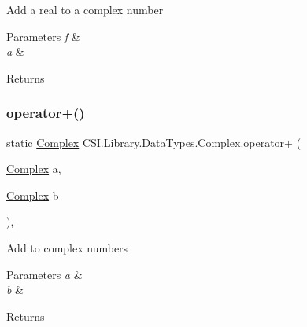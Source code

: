 Add a real to a complex number 


\begin{DoxyParams}{Parameters}
{\em f} & \\
\hline
{\em a} & \\
\hline
\end{DoxyParams}
\begin{DoxyReturn}{Returns}

\end{DoxyReturn}
\mbox{\label{struct_c_s_i_1_1_library_1_1_data_types_1_1_complex_a88fc3ce20a8f379d8301286b4d864bb6}} 
\subsubsection{\texorpdfstring{operator+()}{operator+()}\hspace{0.1cm}{\footnotesize\ttfamily [3/3]}}
{\footnotesize\ttfamily static \mbox{\hyperlink{struct_c_s_i_1_1_library_1_1_data_types_1_1_complex}{Complex}} C\+S\+I.\+Library.\+Data\+Types.\+Complex.\+operator+ (\begin{DoxyParamCaption}\item[{\mbox{\hyperlink{struct_c_s_i_1_1_library_1_1_data_types_1_1_complex}{Complex}}}]{a,  }\item[{\mbox{\hyperlink{struct_c_s_i_1_1_library_1_1_data_types_1_1_complex}{Complex}}}]{b }\end{DoxyParamCaption})\hspace{0.3cm}{\ttfamily [inline]}, {\ttfamily [static]}}



Add to complex numbers 


\begin{DoxyParams}{Parameters}
{\em a} & \\
\hline
{\em b} & \\
\hline
\end{DoxyParams}
\begin{DoxyReturn}{Returns}

\end{DoxyReturn}
\mbox{\label{struct_c_s_i_1_1_library_1_1_data_types_1_1_complex_a206652a66232fd3ce1764db50b548989}} 
